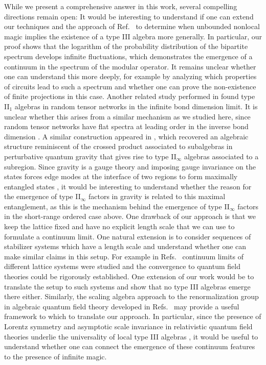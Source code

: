 \documentclass[aps,pra,reprint,superscriptaddress]{revtex4-2}
\theoremstyle{definition}
\theoremstyle{remark}
\begin{document}
While we present a comprehensive answer in this work, several compelling %
directions remain open:
It would be interesting to understand if one can extend our techniques and the approach of Ref.~\cite{Moosa:2026nqz}
to determine when unbounded nonlocal magic implies the existence of a type III algebra more generally.
In particular, our proof shows that the logarithm of the probability
distribution of the bipartite spectrum develops infinite fluctuations, which
demonstrates the emergence of a continuum in the 
spectrum of the modular operator. It remains unclear whether %
one can
understand this more deeply, for example by analyzing which properties of circuits
lead to such a spectrum and whether one can prove the non-existence of finite
projections in this case. Another related study performed in \cite{Sahu:2026xyt} found type II$_1$ algebras in random tensor networks in the infinite bond dimension limit. It is unclear whether this arises from a similar mechanism as we studied here, since random tensor networks have flat spectra at leading order in the inverse bond dimension \cite{Hayden:2016cfa}. A similar construction appeared in \cite{Soni:2023fke}, which recovered an algebraic structure reminiscent of the crossed product associated to subalgebras in perturbative quantum gravity \cite{Witten:2021unn,Chandrasekaran:2022cip,Chandrasekaran:2022eqq,Jensen:2023yxy,Kudler-Flam:2023qfl} that gives rise to type II$_\infty$ algebras associated to a subregion. Since gravity is a gauge theory and imposing gauge invariance on the states forces edge modes at the interface of two regions to form maximally entangled states \cite{Dong:2023kyr}, it would be interesting to understand whether the reason for the emergence of type II$_\infty$ factors in gravity is related to this maximal entanglement, as this is the mechanism behind the emergence of type II$_\infty$ factors in the short-range ordered case above. One drawback of our approach is that we keep the lattice fixed and have no explicit length scale that we can use to formulate a continuum limit. One natural extension is to consider sequences of stabilizer systems which have a length scale and understand whether one can make similar claims in 
this setup. For example in Refs.~\cite{Osborne:2019bsq, Stottmeister:2020ezd, Morinelli:2020uea, Osborne:2021ppp, Stottmeister:2022ptp, Stottmeister:2023wza} continuum limits of different lattice systems were studied and the convergence to quantum field theories could be rigorously established. One extension of our work would be to translate the setup to such systems and show that no type III algebras emerge there either. Similarly, the scaling algebra approach to the renormalization group in algebraic quantum field theory developed in Refs.~\cite{Buchholz:1995gr,Buchholz:1995mx,Verch:1996yf,Buchholz:1997vu,Bostelmann:2007ut,Bostelmann:2009uec} may provide a useful framework to which to translate our approach. In particular, since the presence of Lorentz symmetry and asymptotic scale invariance in relativistic quantum field theories underlie the universality of local type III algebras \cite{Fredenhagen1985}, it would be useful to understand whether one can connect the emergence of these continuum features to the presence of infinite magic.
\end{document}
